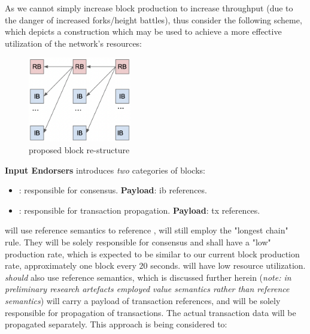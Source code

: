\documentclass[11pt,a4paper]{article}
\begin{document}
As we cannot simply increase block production to increase throughput (due to the danger of increased 
forks/height battles), thus consider the following scheme, which depicts a construction which may 
be used to achieve a more effective utilization of the network's resources:

\begin{figure}[ht]
  \includegraphics[width=0.4\textwidth]{ie_structure.png}
  \centering
  \caption{proposed block re-structure}
  \label{fig:proposed re-structure}
\end{figure}

\pagebreak

\textbf{Input Endorsers} introduces \emph{two} categories of blocks:

\begin{itemize}
  \item \emph{}: responsible for consensus. 
    \subitem \textbf{Payload}: \gls{ib} references.
  \item \emph{}: responsible for transaction propagation.
    \subitem \textbf{Payload}: \gls{tx} references.
\end{itemize}

\textbf{} will use reference semantics to reference ,  will still employ
the "longest chain" rule. They will be solely responsible for consensus and shall have a "low"
production rate, which is expected to be similar to our current block production rate, approximately 
one block every $20$ seconds.  will have low resource utilization. \\

\textbf{} \emph{should} also use reference semantics, which is discussed further herein (\emph{note: in 
preliminary research artefacts  employed value semantics rather than reference semantics})  
will carry a payload of transaction references, and will be solely responsible for propagation of transactions. The 
actual transaction data will be propagated separately. This approach is being considered to:
\end{document}
